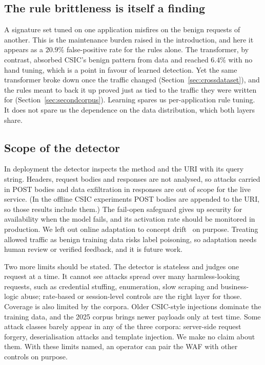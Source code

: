 \documentclass[preprint,11pt]{elsarticle}
\begin{document}
\subsection{The rule brittleness is itself a finding}
A signature set tuned on one application misfires on the benign requests of
another. This is the maintenance burden raised in the introduction, and
here it appears as a $20.9\%$ false-positive rate for the rules alone. The
transformer, by contrast, absorbed CSIC's benign pattern from data and
reached $6.4\%$ with no hand tuning, which is a point in favour of learned
detection. Yet the same transformer broke down once the traffic changed
(Section~\ref{sec:crossdataset}), and the rules meant to back it up proved
just as tied to the traffic they were written for
(Section~\ref{sec:secondcorpus}). Learning spares us per-application rule
tuning. It does not spare us the dependence on the data distribution, which
both layers share.

\subsection{Scope of the detector}
In deployment the detector inspects the method and the URI with its query
string. Headers, request bodies and responses are not analysed, so attacks
carried in POST bodies and data exfiltration in responses are out of scope
for the live service. (In the offline CSIC experiments POST bodies are
appended to the URI, so those results include them.) The fail-open
safeguard gives up security for availability when the model fails, and its
activation rate should be monitored in production. We left out online
adaptation to concept drift~\cite{gama2014drift} on purpose. Treating
allowed traffic as benign training data risks label poisoning, so
adaptation needs human review or verified feedback, and it is future work.

Two more limits should be stated. The detector is stateless and judges one
request at a time. It cannot see attacks spread over many harmless-looking
requests, such as credential stuffing, enumeration, slow scraping and
business-logic abuse; rate-based or session-level controls are the right
layer for those. Coverage is also limited by the corpora. Older CSIC-style
injections dominate the training data, and the 2025 corpus brings newer
payloads only at test time. Some attack classes barely appear in any of the
three corpora: server-side request forgery, deserialisation attacks and
template injection. We make no claim about them. With these limits named,
an operator can pair the WAF with other controls on purpose.
\end{document}
